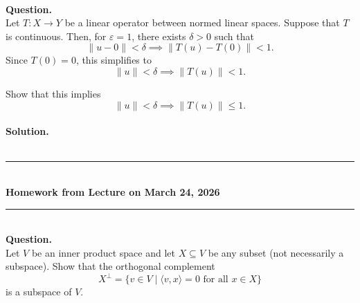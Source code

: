 \documentclass{article}
\begin{document}
\hfill \break  $~\!\!$ \dotfill \medskip \\
\textbf{Question.}\\
Let $T: X \to Y$ be a linear operator between normed linear spaces. Suppose that $T$ is continuous. Then, for $\varepsilon = 1$, there exists $\delta > 0$ such that
\[
\|u - 0\| < \delta \implies \|T(u) - T(0)\| < 1.
\]
Since $T(0) = 0$, this simplifies to
\[
\|u\| < \delta \implies \|T(u)\| < 1.
\]

Show that this implies
\[
\|u\| < \delta \implies \|T(u)\| \le 1.
\]
\noindent\\
\textbf{Solution.}\\
\quad\\
\noindent{}

\bigskip
\begin{center}
\rule{0.5\textwidth}{1pt}\\[6pt]
\textbf{Homework from Lecture on March 24, 2026}\\[2pt]
\rule{0.5\textwidth}{1pt}
\end{center}
\bigskip

\hfill \break  $~\!\!$ \dotfill \medskip \\
\textbf{Question.}\\
Let $V$ be an inner product space and let $X \subseteq V$ be any subset (not necessarily a subspace). Show that the orthogonal complement
\[
X^\perp = \{ v \in V \mid \langle v, x \rangle = 0 \text{ for all } x \in X \}
\]
is a subspace of $V$.
\end{document}
